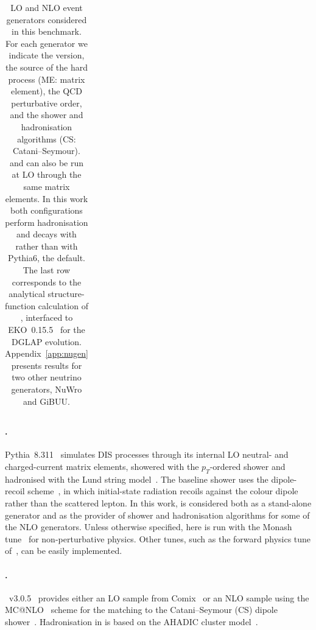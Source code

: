 \begin{table}[!tbp]
{\begin{tabular}{llllll}
    \bottomrule
  \end{tabular}}
  \vspace{0.5cm}
  \caption{LO and NLO event generators considered in this benchmark.
    For each generator we indicate the version, the source of the hard process (ME: matrix element), the QCD perturbative order, and the shower and hadronisation algorithms (CS: Catani--Seymour).
  \sherpa and \herwig can also be run at LO through the same matrix elements.
  In this work both \genie configurations perform hadronisation and decays with \pythia rather than with {\sc Pythia6}, the \genie default.
  The last row corresponds to the analytical structure-function calculation of \yadism, interfaced to {\sc EKO}~0.15.5~\cite{Candido:2022tld} for the DGLAP evolution.
  Appendix~\ref{app:nugen}
  presents results for two other neutrino generators,  {\sc\small NuWro} and {\sc\small GiBUU}.  
  }
  \label{tab:generators}
\end{table}

\paragraph{\pythia.}  {\sc\small Pythia}~8.311~\cite{Bierlich:2022pfr} simulates DIS processes
through its internal LO neutral- and charged-current matrix elements, showered
with the $p_T$-ordered shower and hadronised with the Lund string model~\cite{Andersson:1983ia}.  
%
The baseline shower uses the dipole-recoil scheme~\cite{Cabouat:2017rzi}, in which initial-state radiation recoils against the colour dipole rather than the scattered lepton.
%
In this work, \pythia is considered both as a stand-alone generator and as the provider of shower and hadronisation algorithms for some of the NLO generators.
%
Unless otherwise specified, here \pythia is run with the Monash tune~\cite{Skands:2014pea} for non-perturbative physics. Other tunes, such as the forward physics tune of~\cite{Fieg:2023kld}, can be easily implemented. 

\paragraph{\sherpa.}  \sherpa~v3.0.5~\cite{Sherpa:2019gpd,Bothmann:2024} provides either an LO sample from {\sc Comix}~\cite{Gleisberg:2008fv} or an NLO sample using the MC@NLO~\cite{Frixione:2002ik} scheme for the matching to the Catani--Seymour (CS) dipole
shower~\cite{Schumann:2007mg}.
%
Hadronisation in \sherpa is based on the {\sc AHADIC} cluster model~\cite{Winter:2003tt,Chahal:2022rid}.  

